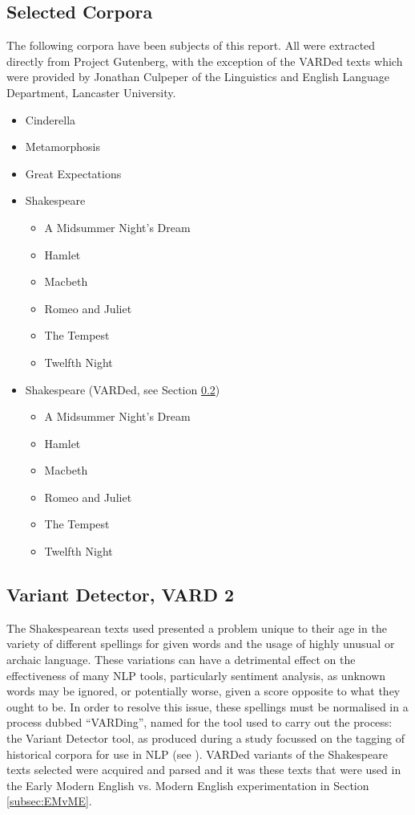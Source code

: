 \documentclass{article}
\begin{document}
{    \subsection{Selected Corpora}
    The following corpora have been subjects of this report. All were extracted directly from Project Gutenberg, with the exception of the VARDed texts which were provided by Jonathan Culpeper of the Linguistics and English Language Department, Lancaster University.
        \begin{itemize}
            \item Cinderella
            \item Metamorphosis
            \item Great Expectations
            \item Shakespeare
            \begin{itemize}
                \item A Midsummer Night's Dream
                \item Hamlet
                \item Macbeth
                \item Romeo and Juliet
                \item The Tempest
                \item Twelfth Night
            \end{itemize}
            \item Shakespeare (VARDed, see Section \ref{subsec:vard})
            \begin{itemize}
                \item A Midsummer Night's Dream
                \item Hamlet
                \item Macbeth
                \item Romeo and Juliet
                \item The Tempest
                \item Twelfth Night
            \end{itemize}
        \end{itemize}
    \subsection{Variant Detector, VARD 2}
    \label{subsec:vard}
        The Shakespearean texts used presented a problem unique to their age in the variety of different spellings for given words and the usage of highly unusual or archaic language. These variations can have a detrimental effect on the effectiveness of many NLP tools, particularly sentiment analysis, as unknown words may be ignored, or potentially worse, given a score opposite to what they ought to be. In order to resolve this issue, these spellings must be normalised in a process dubbed ``VARDing'', named for the tool used to carry out the process: the Variant Detector tool, \citep{baron2008vard2} as produced during a study focussed on the tagging of historical corpora for use in NLP (see \cite{rayson2007tagging}). VARDed variants of the Shakespeare texts selected were acquired and parsed and it was these texts that were used in the Early Modern English vs. Modern English experimentation in Section \ref{subsec:EMvME}.
}
\end{document}
